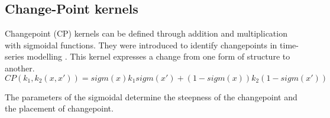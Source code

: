 \subsection{Change-Point kernels}\label{subSecCh4CPKernel}
Changepoint (CP) kernels can be defined through addition and multiplication with sigmoidal functions. They were introduced to identify changepoints in time-series modelling \cite{osborne2010bayesian}. This kernel expresses a change from one form of structure to another. 
\begin{equation} \label{eq:changePointKernel}
CP(k_{1}, k_{2}(x, x')) = sigm(x)k_{1}sigm(x') + (1-sigm(x))k_{2}(1-sigm(x'))
\end{equation}

The parameters of the sigmoidal determine the steepness of the changepoint and the placement of changepoint.


\begin{figure}[!ht]
  \centering
  \quad
    \quad
  \quad
  \caption{}
\end{figure}

